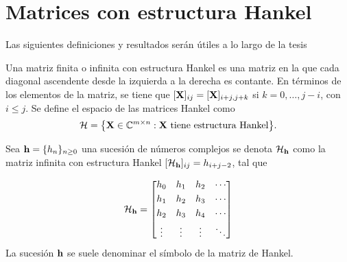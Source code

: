 

    \section{Matrices con estructura Hankel}\label{sec:HankelMatrix}

        Las siguientes definiciones y resultados serán útiles a lo largo de la tesis

        \begin{definition}\label{Def:Hankel}
            Una matriz finita o infinita con estructura Hankel es una matriz en la que cada diagonal ascendente desde la izquierda a la derecha es contante. En términos de los elementos de la matriz, se tiene que $[\mathbf{X}]_{ij} = [\mathbf{X}]_{i+j,j+k}$ si $k = 0,\ldots,j-i$, con $i\le j$. Se define el espacio de las matrices Hankel como
		      \begin{equation}
			    \mathcal{H} = \big\{\mathbf{X}\in\mathbb{C}^{m\times n}:\mathbf{X} \text{ tiene estructura Hankel}\big\}.
			    \label{Eq:HankelSet}
		      \end{equation}
	       \end{definition}

        Sea $\mathbf{h} = \{h_n\}_{n\ge0}$ una sucesión de números complejos se denota $\mathcal{H}_{\mathbf{h}}$ como la matriz infinita con estructura Hankel $[\mathcal{H}_{\mathbf{h}}]_{ij} = h_{i+j-2}$, tal que

        \begin{equation}
	        \mathcal{H}_{\mathbf{h}} = \begin{bmatrix} h_0 & h_1 & h_2 & \cdots \\[0.3em] h_1 & h_2 & h_3 & \cdots \\[0.3em] h_2 & h_3 & h_4 & \cdots \\[0.3em]\vdots & \vdots & \vdots & \ddots \end{bmatrix}
	        \label{Eq:InfiniteHankelMatrix}
        \end{equation}
        La sucesión $\mathbf{h}$ se suele denominar el símbolo de la matriz de Hankel.


